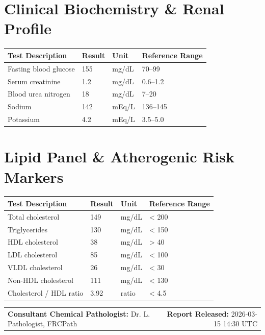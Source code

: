 \documentclass[10pt,a4paper]{article}
\begin{document}
\vspace{8pt}

\section*{Clinical Biochemistry \& Renal Profile}

\begin{tabular}{@{} p{6.4cm} p{2.5cm} p{2.5cm} p{3.1cm} @{}}
  \toprule
  \textbf{Test Description} & \textbf{Result} & \textbf{Unit} & \textbf{Reference Range} \\
  \midrule
  Fasting blood glucose & 155 & mg/dL & 70--99 \\
  Serum creatinine & 1.2 & mg/dL & 0.6--1.2 \\
  Blood urea nitrogen & 18 & mg/dL & 7--20 \\
  Sodium & 142 & mEq/L & 136--145 \\
  Potassium & 4.2 & mEq/L & 3.5--5.0 \\
  \bottomrule
\end{tabular}

\vspace{8pt}

\section*{Lipid Panel \& Atherogenic Risk Markers}

\begin{tabular}{@{} p{6.4cm} p{2.5cm} p{2.5cm} p{3.1cm} @{}}
  \toprule
  \textbf{Test Description} & \textbf{Result} & \textbf{Unit} & \textbf{Reference Range} \\
  \midrule
  Total cholesterol & 149 & mg/dL & < 200 \\
  Triglycerides & 130 & mg/dL & < 150 \\
  HDL cholesterol & 38 & mg/dL & > 40 \\
  LDL cholesterol & 85 & mg/dL & < 100 \\
  VLDL cholesterol & 26 & mg/dL & < 30 \\
  Non-HDL cholesterol & 111 & mg/dL & < 130 \\
  Cholesterol / HDL ratio & 3.92 & ratio & < 4.5 \\
  \bottomrule
\end{tabular}

\vspace{14pt}

\noindent
\begin{tabular*}{\textwidth}{@{} l @{\extracolsep{\fill}} r @{}}
  \textbf{Consultant Chemical Pathologist:} Dr. L. Pathologist, FRCPath & \textbf{Report Released:} 2026-03-15 14:30 UTC \\
\end{tabular*}
\end{document}
